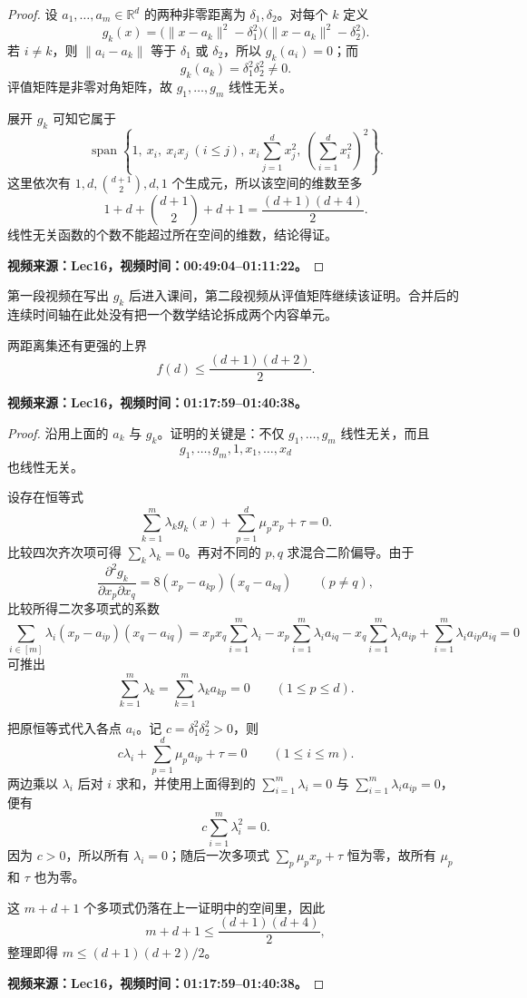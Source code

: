 \begin{proof}
设 $a_1,\dots,a_m\in\mathbb{R}^d$ 的两种非零距离为 $\delta_1,\delta_2$。对每个 $k$ 定义
\[
g_k(x)=\bigl(\lVert x-a_k\rVert^2-\delta_1^2\bigr)
       \bigl(\lVert x-a_k\rVert^2-\delta_2^2\bigr).
\]
若 $i\ne k$，则 $\lVert a_i-a_k\rVert$ 等于 $\delta_1$ 或 $\delta_2$，所以 $g_k(a_i)=0$；而
\[
g_k(a_k)=\delta_1^2\delta_2^2\ne0.
\]
评值矩阵是非零对角矩阵，故 $g_1,\dots,g_m$ 线性无关。

展开 $g_k$ 可知它属于
\[
\operatorname{span}\left\{
1,\ x_i,\ x_ix_j\ (i\leq j),\
x_i\sum_{j=1}^d x_j^2,\
\left(\sum_{i=1}^d x_i^2\right)^2
\right\}.
\]
这里依次有 $1,d,\binom{d+1}{2},d,1$ 个生成元，所以该空间的维数至多
\[
1+d+\binom{d+1}{2}+d+1
=\frac{(d+1)(d+4)}2.
\]
线性无关函数的个数不能超过所在空间的维数，结论得证。

\ifdefined\VideoNotesTestMode
\textbf{视频来源：Lec16，视频时间：00:49:04--01:11:22。}
\fi
\end{proof}

\ifdefined\VideoNotesTestMode
第一段视频在写出 $g_k$ 后进入课间，第二段视频从评值矩阵继续该证明。合并后的连续时间轴在此处没有把一个数学结论拆成两个内容单元。
\fi

\begin{theorem}
两距离集还有更强的上界
\[
f(d)\leq\frac{(d+1)(d+2)}2.
\]

\ifdefined\VideoNotesTestMode
\textbf{视频来源：Lec16，视频时间：01:17:59--01:40:38。}
\fi
\end{theorem}

\begin{proof}
沿用上面的 $a_k$ 与 $g_k$。证明的关键是：不仅 $g_1,\dots,g_m$ 线性无关，而且
\[
g_1,\dots,g_m,1,x_1,\dots,x_d
\]
也线性无关。

设存在恒等式
\[
\sum_{k=1}^m\lambda_kg_k(x)+\sum_{p=1}^d\mu_px_p+\tau=0.
\]
比较四次齐次项可得 $\sum_k\lambda_k=0$。再对不同的 $p,q$ 求混合二阶偏导。由于
\[
\frac{\partial^2 g_k}{\partial x_p\partial x_q}
=8(x_p-a_{kp})(x_q-a_{kq})\qquad(p\ne q),
\]
比较所得二次多项式的系数
\[
   \sum_{i\in[m]}\lambda_i(x_p-a_{ip})(x_q-a_{iq})=x_px_q\sum_{i=1}^m\lambda_i-x_p\sum_{i=1}^m\lambda_ia_{iq}-x_q\sum_{i=1}^m\lambda_ia_{ip}+\sum_{i=1}^m\lambda_ia_{ip}a_{iq}=0
\]
可推出
\[
\sum_{k=1}^m\lambda_k=\sum_{k=1}^m\lambda_ka_{kp}=0
\qquad(1\leq p\leq d).
\]

把原恒等式代入各点 $a_i$。记 $c=\delta_1^2\delta_2^2>0$，则
\[
c\lambda_i+\sum_{p=1}^d\mu_pa_{ip}+\tau=0
\qquad(1\leq i\leq m).
\]
两边乘以 $\lambda_i$ 后对 $i$ 求和，并使用上面得到的
$\sum_{i=1}^m\lambda_i=0$ 与 $\sum_{i=1}^m\lambda_i a_{ip}=0$，便有
\[
c\sum_{i=1}^m\lambda_i^2=0.
\]
因为 $c>0$，所以所有 $\lambda_i=0$；随后一次多项式
$\sum_p\mu_px_p+\tau$ 恒为零，故所有 $\mu_p$ 和 $\tau$ 也为零。

这 $m+d+1$ 个多项式仍落在上一证明中的空间里，因此
\[
m+d+1\leq\frac{(d+1)(d+4)}2,
\]
整理即得 $m\leq (d+1)(d+2)/2$。

\ifdefined\VideoNotesTestMode
\textbf{视频来源：Lec16，视频时间：01:17:59--01:40:38。}
\fi
\end{proof}

